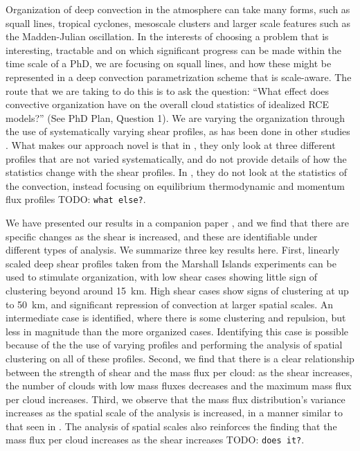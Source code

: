 \documentclass[11pt,a4paper]{article}
\newcommand{\todo}{TODO: \texttt}
\begin{document}
Organization of deep convection in the atmosphere can take many forms, such as squall lines, tropical cyclones, mesoscale clusters and larger scale features such as the Madden-Julian oscillation. In the interests of choosing a problem that is interesting, tractable and on which significant progress can be made within the time scale of a PhD, we are focusing on squall lines, and how these might be represented in a deep convection parametrization scheme that is scale-aware. The route that we are taking to do this is to ask the question: ``What effect does convective organization have on the overall cloud statistics of idealized RCE models?'' (See PhD Plan, Question 1). We are varying the organization through the use of systematically varying shear profiles, as has been done in other studies . What makes our approach novel is that in \cite{CC2006II}, they only look at three different profiles that are not varied systematically, and do not provide details of how the statistics change with the shear profiles. In \cite{RE2001}, they do not look at the statistics of the convection, instead focusing on equilibrium thermodynamic and momentum flux profiles \todo{what else?}. 

We have presented our results in a companion paper \parencite{muetz2017effects}, and we find that there are specific changes as the shear is increased, and these are identifiable under different types of analysis. We summarize three key results here. First, linearly scaled deep shear profiles taken from the Marshall Islands experiments \cite{yanai} can be used to stimulate organization, with low shear cases showing little sign of clustering beyond around \SI{15}{km}. High shear cases show signs of clustering at up to \SI{50}{km}, and significant repression of convection at larger spatial scales. An intermediate case is identified, where there is some clustering and repulsion, but less in magnitude than the more organized cases. Identifying this case is possible because of the the use of varying profiles and performing the analysis of spatial clustering on all of these profiles. Second, we find that there is a clear relationship between the strength of shear and the mass flux per cloud: as the shear increases, the number of clouds with low mass fluxes decreases and the maximum mass flux per cloud increases. Third, we observe that the mass flux distribution's variance increases as the spatial scale of the analysis is increased, in a manner similar to that seen in \cite{plant2008stochastic}. The analysis of spatial scales also reinforces the finding that the mass flux per cloud increases as the shear increases \todo{does it?}.
\end{document}
